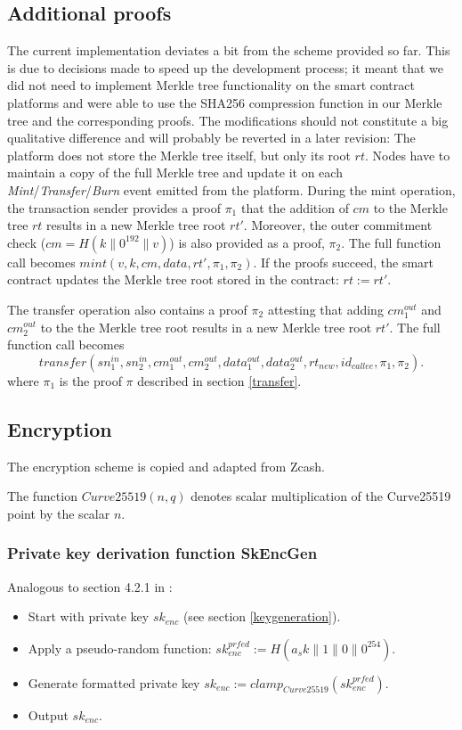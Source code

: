 \documentclass{article}
\newcommand{\conc}{\mathbin{\|}}
\begin{document}
\subsection{Additional proofs}
The current implementation deviates a bit from the scheme provided so far. This is due to decisions made to speed up the development process; it meant that we did not need to implement Merkle tree functionality on the smart contract platforms and were able to use the SHA256 compression function in our Merkle tree and the corresponding proofs. The modifications should not constitute a big qualitative difference and will probably be reverted in a later revision: The platform does not store the Merkle tree itself, but only its root $rt$. Nodes have to maintain a copy of the full Merkle tree and update it on each \textit{Mint}/\textit{Transfer}/\textit{Burn} event emitted from the platform.
During the mint operation, the transaction sender provides a proof $\pi_{1}$ that the addition of $cm$ to the Merkle tree $rt$ results in a new Merkle tree root $rt'$.
Moreover, the outer commitment check ($cm = H(k \conc 0^{192} \conc v)$) is also provided as a proof, $\pi_{2}$. The full function call becomes $mint(v, k, cm, data, rt', \pi_1, \pi_2)$. If the proofs succeed, the smart contract updates the Merkle tree root stored in the contract: $rt := rt'$.

The transfer operation also contains a proof $\pi_2$ attesting that adding $cm_1^{out}$ and $cm_2^{out}$ to the the Merkle tree root results in a new Merkle tree root $rt'$. The full function call becomes 
$$transfer(sn_1^{in}, sn_2^{in}, cm_1^{out}, cm_2^{out}, data_1^{out}, data_2^{out}, rt_{new}, id_{callee}, \pi_{1}, \pi_{2}).$$
where $\pi_1$ is the proof $\pi$ described in section \ref{transfer}.

\pagebreak

\subsection{Encryption} \label{encryption}
The encryption scheme is copied and adapted from Zcash.

The function $Curve25519(n,q)$ denotes scalar multiplication of the Curve25519 point by the scalar $n$.

\subsubsection{Private key derivation function SkEncGen}
Analogous to section 4.2.1 in \cite{zcash}:
\begin{itemize}
\item Start with private key $sk_{enc}$ (see section \ref{keygeneration}).
\item Apply a pseudo-random function: $sk_{enc}^{prfed} := H(a_sk \conc 1 \conc 0 \conc 0^{254})$.
\item Generate formatted private key $sk_{enc} := clamp_{Curve25519}(sk_{enc}^{prfed})$.
\item Output $sk_{enc}$.
\end{itemize}
\end{document}
